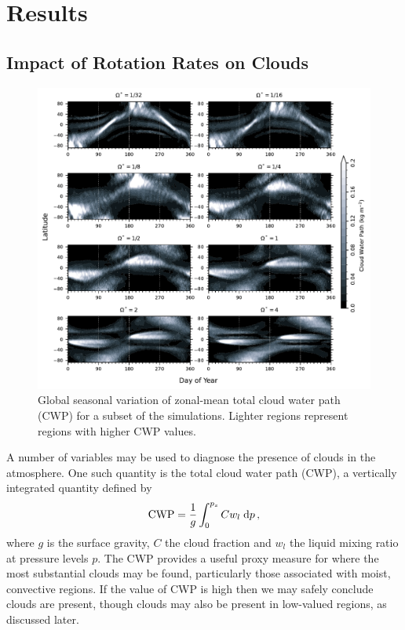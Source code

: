 \section{Results}\label{sec:results}
\subsection{Impact of Rotation Rates on Clouds}



\begin{figure}[t]
    \centering
    \includegraphics[width=1.0\textwidth]{plots/1-alternative_cwp.pdf}
    \caption{Global seasonal variation of zonal-mean total cloud water path (CWP) for a subset of the simulations. Lighter regions represent regions with higher CWP values.}
    \label{fig:global_cloud_cover}
\end{figure}

A number of variables may be used to diagnose the presence of clouds in the atmosphere. One such quantity is the total cloud water path (CWP), a vertically integrated quantity defined by 
\begin{equation}\label{eq:cwp}
    \textrm{CWP} = \frac{1}{g}\int_{0}^{p_s} C w_l \;\dff p\,,
\end{equation}
where $g$ is the surface gravity, $C$ the cloud fraction and $w_l$ the liquid mixing ratio at pressure levels $p$. The CWP provides a useful proxy measure for where the most substantial clouds may be found, particularly those associated with moist, convective regions. If the value of CWP is high then we may safely conclude clouds are present, though clouds may also be present in low-valued regions, as discussed later.

